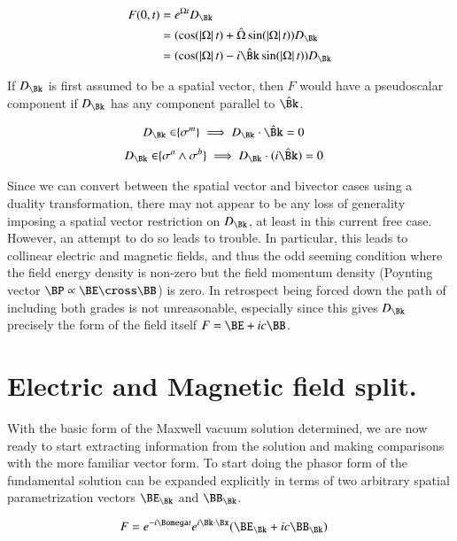 \begin{align*}
F(0, t)
&= e^{\Omega t} D_\Bk \\
&= (\cos(\Abs{\Omega} t) + \hat{\Omega} \sin(\Abs{\Omega} t)) D_\Bk \\
&= (\cos(\Abs{\Omega} t) - i \hat{\Bk} \sin(\Abs{\Omega} t)) D_\Bk \\
\end{align*}

If $D_\Bk$ is first assumed to be a spatial vector, then $F$ would have a pseudoscalar component if $D_\Bk$ has any component parallel to $\hat{\Bk}$.

\begin{align}\label{eqn:commutationRequirementVector}
D_\Bk \in \span\{\sigma^m\} \implies D_\Bk \cdot \hat{\Bk} = 0
\end{align}
\begin{align}\label{eqn:commutationRequirementBiVector}
D_\Bk \in \span\{\sigma^a \wedge \sigma^b\} \implies D_\Bk \cdot (i\hat{\Bk}) = 0
\end{align}

Since we can convert between the spatial vector and bivector cases using a duality transformation, there may not appear to be any loss of generality imposing a spatial vector restriction on $D_\Bk$, at least in this current free case.  However, an attempt to do so leads to trouble.  In particular, this leads to collinear electric and magnetic fields, and thus the odd seeming condition where the field energy density is non-zero but the field momentum density (Poynting vector $\BP \propto \BE \cross \BB$) is zero.  In retrospect being forced down the path of including both grades is not unreasonable, especially since this gives $D_\Bk$ precisely the form of the field itself $F = \BE + i c \BB$.

\section{Electric and Magnetic field split.}

With the basic form of the Maxwell vacuum solution determined, we are now ready to start extracting information from the solution and making comparisons with the more familiar vector form.  To start doing the phasor form of the fundamental solution can be expanded explicitly in terms of two arbitrary spatial parametrization vectors $\BE_\Bk$ and $\BB_\Bk$.

\begin{align}\label{eqn:phasor}
F &= e^{-i\Bomega t} e^{i \Bk \cdot \Bx} (\BE_\Bk + i c \BB_\Bk)
\end{align}

